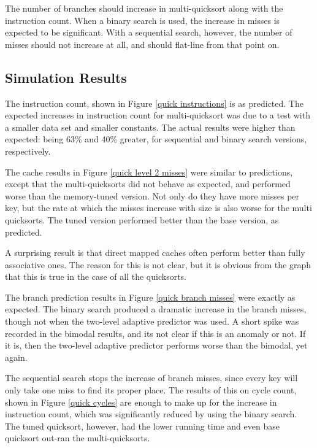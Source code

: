 The number of branches should increase in multi-quicksort along with the
instruction count. When a binary search is used, the increase in misses is
expected to be significant. With a sequential search, however, the number of
misses should not increase at all, and should flat-line from that point on.

\subsection{Simulation Results}


The instruction count, shown in Figure \ref{quick instructions} is as
predicted. The expected increases in instruction count for multi-quicksort was
due to a test with a smaller data set and smaller constants. The actual results
were higher than expected: being 63\% and 40\% greater, for
sequential and binary search versions, respectively.

The cache results in Figure \ref{quick level 2 misses} were similar to
predictions, except that the multi-quicksorts did not behave as expected, and
performed worse than the memory-tuned version. Not only do they have more
misses per key, but the rate at which the misses increase with size is also
worse for the multi quicksorts. The tuned version performed better than the
base version, as predicted.

A surprising result is that direct mapped caches often perform better than fully
associative ones. The reason for this is not clear, but it is obvious from the
graph that this is true in the case of all the quicksorts.

The branch prediction results in Figure \ref{quick branch misses} were exactly
as expected. The binary search produced a dramatic increase in the branch
misses, though not when the two-level adaptive predictor was used. A short spike
was recorded in the bimodal results, and its not clear if this is an anomaly or
not. If it is, then the two-level adaptive predictor performs worse than the
bimodal, yet again.

The sequential search stops the increase of branch misses, since every key will
only take one miss to find its proper place. The results of this on cycle count,
shown in Figure \ref{quick cycles} are enough to make up for the increase in
instruction count, which was significantly reduced by using the binary search.
The tuned quicksort, however, had the lower running time and even base
quicksort out-ran the multi-quicksorts.

